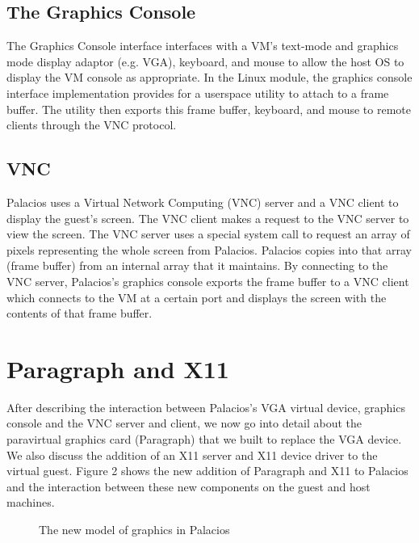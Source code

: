 \documentclass{acm_proc_article-sp}
\begin{document}
\subsection{The Graphics Console} %
The Graphics Console interface interfaces with a VM's text\--mode and graphics
mode display adaptor (e.g. VGA), keyboard, and mouse to allow the host OS to display the VM
console as appropriate. In the Linux module, the graphics console interface implementation provides
for a userspace utility to attach to a frame buffer. The utility then exports this frame buffer, keyboard,
and mouse to remote clients through the VNC protocol. \cite{Dinda: Technical}

\subsection{VNC}
Palacios uses a Virtual Network Computing (VNC) server and a VNC client to
display the guest's screen. The VNC client makes a request to the VNC server to view the screen. 
The VNC server uses a special system call to request an array of pixels representing the whole screen from Palacios. 
Palacios copies into that array (frame buffer) from an internal array that it
maintains. By connecting to the VNC server, Palacios's graphics console exports
the frame buffer to a VNC client which connects to the VM at a certain port and
displays the screen with the contents of that frame buffer.

\section{Paragraph and X11}
After describing the interaction between Palacios's VGA virtual
device, graphics console and the VNC server and client, we now go into detail
about the paravirtual graphics card (Paragraph) that we built to replace the VGA
device. We also discuss the addition of an X11 server and X11 device driver to
the virtual guest. Figure 2 shows the new addition of Paragraph and X11 to
Palacios and the interaction between these new components on the guest and host
machines.
\begin{figure}[h]                                              
\centering                                                     
{}                   
\caption{The new model of graphics in Palacios}   
\end{figure}                                                   
\end{document}
